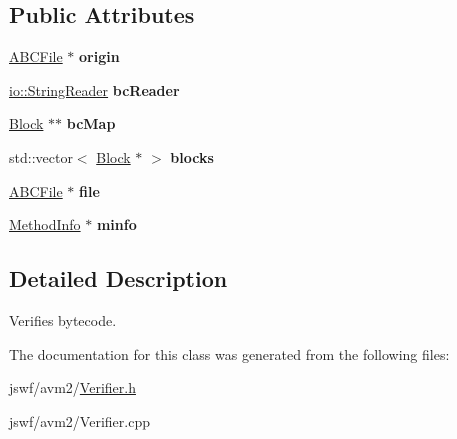 \subsection*{Public Attributes}
\begin{DoxyCompactItemize}
\item 
\hypertarget{classjswf_1_1avm2_1_1_verifier_a5712df1674bf3a7d6fd2a840e3f60f0d}{\hyperlink{classjswf_1_1avm2_1_1_a_b_c_file}{A\+B\+C\+File} $\ast$ {\bfseries origin}}\label{classjswf_1_1avm2_1_1_verifier_a5712df1674bf3a7d6fd2a840e3f60f0d}

\item 
\hypertarget{classjswf_1_1avm2_1_1_verifier_adc0ad7c8a8c7f2780eb6511328a30af7}{\hyperlink{classjswf_1_1io_1_1_string_reader}{io\+::\+String\+Reader} {\bfseries bc\+Reader}}\label{classjswf_1_1avm2_1_1_verifier_adc0ad7c8a8c7f2780eb6511328a30af7}

\item 
\hypertarget{classjswf_1_1avm2_1_1_verifier_a729ab37a42f6f197e60a0ebf0e8fade0}{\hyperlink{structjswf_1_1avm2_1_1_block}{Block} $\ast$$\ast$ {\bfseries bc\+Map}}\label{classjswf_1_1avm2_1_1_verifier_a729ab37a42f6f197e60a0ebf0e8fade0}

\item 
\hypertarget{classjswf_1_1avm2_1_1_verifier_ac590b9f5d00ff87e9462fa7df548b928}{std\+::vector$<$ \hyperlink{structjswf_1_1avm2_1_1_block}{Block} $\ast$ $>$ {\bfseries blocks}}\label{classjswf_1_1avm2_1_1_verifier_ac590b9f5d00ff87e9462fa7df548b928}

\item 
\hypertarget{classjswf_1_1avm2_1_1_verifier_a90c1cc682baeb84e899fc2f9875dcfa8}{\hyperlink{classjswf_1_1avm2_1_1_a_b_c_file}{A\+B\+C\+File} $\ast$ {\bfseries file}}\label{classjswf_1_1avm2_1_1_verifier_a90c1cc682baeb84e899fc2f9875dcfa8}

\item 
\hypertarget{classjswf_1_1avm2_1_1_verifier_ac46a2898ebbe1127765ef2a740159781}{\hyperlink{structjswf_1_1avm2_1_1_method_info}{Method\+Info} $\ast$ {\bfseries minfo}}\label{classjswf_1_1avm2_1_1_verifier_ac46a2898ebbe1127765ef2a740159781}

\end{DoxyCompactItemize}


\subsection{Detailed Description}
Verifies bytecode. 

The documentation for this class was generated from the following files\+:\begin{DoxyCompactItemize}
\item 
jswf/avm2/\hyperlink{_verifier_8h}{Verifier.\+h}\item 
jswf/avm2/Verifier.\+cpp\end{DoxyCompactItemize}
